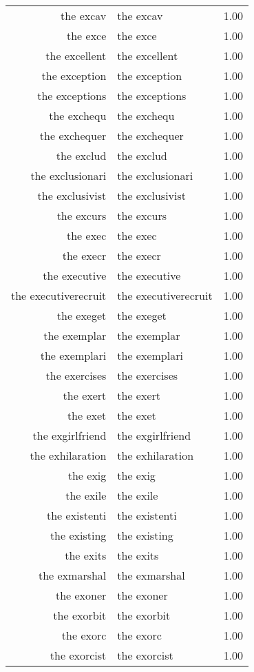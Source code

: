 \begin{table}[ht]
\begin{tabular}{rlr}
  the excav & the excav & 1.00 \\ 
  the exce & the exce & 1.00 \\ 
  the excellent & the excellent & 1.00 \\ 
  the exception & the exception & 1.00 \\ 
  the exceptions & the exceptions & 1.00 \\ 
  the exchequ & the exchequ & 1.00 \\ 
  the exchequer & the exchequer & 1.00 \\ 
  the exclud & the exclud & 1.00 \\ 
  the exclusionari & the exclusionari & 1.00 \\ 
  the exclusivist & the exclusivist & 1.00 \\ 
  the excurs & the excurs & 1.00 \\ 
  the exec & the exec & 1.00 \\ 
  the execr & the execr & 1.00 \\ 
  the executive & the executive & 1.00 \\ 
  the executiverecruit & the executiverecruit & 1.00 \\ 
  the exeget & the exeget & 1.00 \\ 
  the exemplar & the exemplar & 1.00 \\ 
  the exemplari & the exemplari & 1.00 \\ 
  the exercises & the exercises & 1.00 \\ 
  the exert & the exert & 1.00 \\ 
  the exet & the exet & 1.00 \\ 
  the exgirlfriend & the exgirlfriend & 1.00 \\ 
  the exhilaration & the exhilaration & 1.00 \\ 
  the exig & the exig & 1.00 \\ 
  the exile & the exile & 1.00 \\ 
  the existenti & the existenti & 1.00 \\ 
  the existing & the existing & 1.00 \\ 
  the exits & the exits & 1.00 \\ 
  the exmarshal & the exmarshal & 1.00 \\ 
  the exoner & the exoner & 1.00 \\ 
  the exorbit & the exorbit & 1.00 \\ 
  the exorc & the exorc & 1.00 \\ 
  the exorcist & the exorcist & 1.00 \\ 

\end{tabular}
\end{table}
